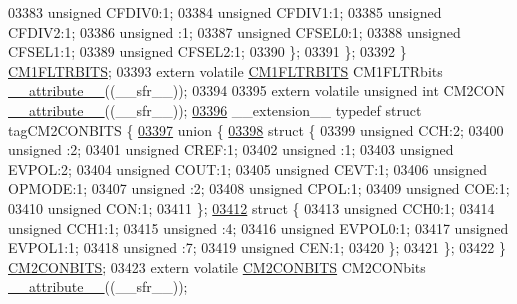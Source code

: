 \begin{DoxyCode}
03383       \textcolor{keywordtype}{unsigned} CFDIV0:1;
03384       \textcolor{keywordtype}{unsigned} CFDIV1:1;
03385       \textcolor{keywordtype}{unsigned} CFDIV2:1;
03386       \textcolor{keywordtype}{unsigned} :1;
03387       \textcolor{keywordtype}{unsigned} CFSEL0:1;
03388       \textcolor{keywordtype}{unsigned} CFSEL1:1;
03389       \textcolor{keywordtype}{unsigned} CFSEL2:1;
03390     \};
03391   \};
03392 \} \hyperlink{a00014_d5/d0f/a00308}{CM1FLTRBITS};
03393 \textcolor{keyword}{extern} \textcolor{keyword}{volatile} \hyperlink{a00014_d5/d0f/a00308}{CM1FLTRBITS} CM1FLTRbits \hyperlink{a00015_a493c46f03454991ccc5aa7a6e1dfb2a7}{\_\_attribute\_\_}((\_\_sfr\_\_));
03394 
03395 \textcolor{keyword}{extern} \textcolor{keyword}{volatile} \textcolor{keywordtype}{unsigned} \textcolor{keywordtype}{int}  CM2CON \hyperlink{a00015_a493c46f03454991ccc5aa7a6e1dfb2a7}{\_\_attribute\_\_}((\_\_sfr\_\_));
\hypertarget{a00015_source_l03396}{}\hyperlink{a00014}{03396} \_\_extension\_\_ \textcolor{keyword}{typedef} \textcolor{keyword}{struct }tagCM2CONBITS \{
\hypertarget{a00015_source_l03397}{}\hyperlink{a00015}{03397}   \textcolor{keyword}{union }\{
\hypertarget{a00015_source_l03398}{}\hyperlink{a00015}{03398}     \textcolor{keyword}{struct }\{
03399       \textcolor{keywordtype}{unsigned} CCH:2;
03400       \textcolor{keywordtype}{unsigned} :2;
03401       \textcolor{keywordtype}{unsigned} CREF:1;
03402       \textcolor{keywordtype}{unsigned} :1;
03403       \textcolor{keywordtype}{unsigned} EVPOL:2;
03404       \textcolor{keywordtype}{unsigned} COUT:1;
03405       \textcolor{keywordtype}{unsigned} CEVT:1;
03406       \textcolor{keywordtype}{unsigned} OPMODE:1;
03407       \textcolor{keywordtype}{unsigned} :2;
03408       \textcolor{keywordtype}{unsigned} CPOL:1;
03409       \textcolor{keywordtype}{unsigned} COE:1;
03410       \textcolor{keywordtype}{unsigned} CON:1;
03411     \};
\hypertarget{a00015_source_l03412}{}\hyperlink{a00015}{03412}     \textcolor{keyword}{struct }\{
03413       \textcolor{keywordtype}{unsigned} CCH0:1;
03414       \textcolor{keywordtype}{unsigned} CCH1:1;
03415       \textcolor{keywordtype}{unsigned} :4;
03416       \textcolor{keywordtype}{unsigned} EVPOL0:1;
03417       \textcolor{keywordtype}{unsigned} EVPOL1:1;
03418       \textcolor{keywordtype}{unsigned} :7;
03419       \textcolor{keywordtype}{unsigned} CEN:1;
03420     \};
03421   \};
03422 \} \hyperlink{a00014_d4/d6f/a00315}{CM2CONBITS};
03423 \textcolor{keyword}{extern} \textcolor{keyword}{volatile} \hyperlink{a00014_d4/d6f/a00315}{CM2CONBITS} CM2CONbits \hyperlink{a00015_a493c46f03454991ccc5aa7a6e1dfb2a7}{\_\_attribute\_\_}((\_\_sfr\_\_));

\end{DoxyCode}
